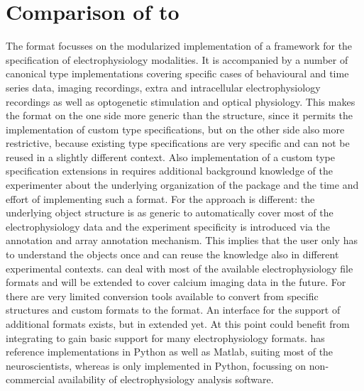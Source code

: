 \section{Comparison of  to }
The  format focusses on the modularized implementation of a framework for the specification of electrophysiology modalities. %
It is accompanied by a number of canonical type implementations covering specific cases of behavioural  and time series data, imaging recordings, extra and intracellular electrophysiology recordings as well as optogenetic stimulation and optical physiology.  %
This makes the  format on the one side more generic than the  structure, since it permits the implementation of custom type specifications, but on the other side also more restrictive, because existing type specifications are very specific and can not be reused in a slightly different context. Also implementation of a custom type specification extensions in  requires additional background knowledge of the experimenter about the underlying organization of the  package and the time and effort of implementing such a format. %
For  the approach is different: the underlying object structure is as generic to automatically cover most of the electrophysiology data and the experiment specificity is introduced via the annotation and array annotation mechanism. This implies that the user only has to understand the  objects once and can reuse the knowledge also in different experimental contexts.
 can deal with most of the available electrophysiology file formats and will be extended to cover calcium imaging data in the future. For  there are very limited conversion tools available to convert from specific  structures and custom formats to the  format. %
An interface for the support of additional formats exists, but in extended yet. At this point  could benefit from integrating  to gain basic support for many electrophysiology formats.
 has reference implementations in Python as well as Matlab, suiting most of the neuroscientists, whereas  is only implemented in Python, focussing on non-commercial availability of electrophysiology analysis software.


